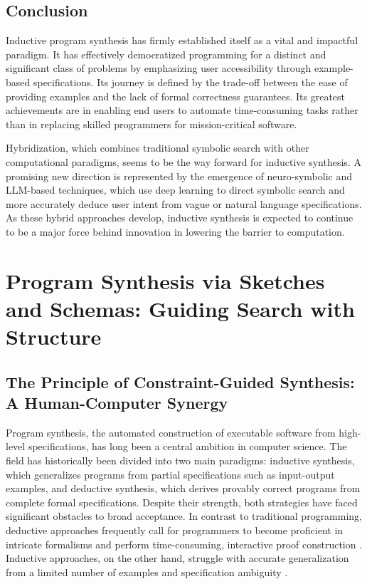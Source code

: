 \documentclass[12pt, a4paper]{report}
\begin{document}
\section{Conclusion}

Inductive program synthesis has firmly established itself as a vital and impactful paradigm. It has effectively democratized programming for a distinct and significant class of problems by emphasizing user accessibility through example-based specifications. Its journey is defined by the trade-off between the ease of providing examples and the lack of formal correctness guarantees. Its greatest achievements are in enabling end users to automate time-consuming tasks rather than in replacing skilled programmers for mission-critical software.

Hybridization, which combines traditional symbolic search with other computational paradigms, seems to be the way forward for inductive synthesis. A promising new direction is represented by the emergence of neuro-symbolic and LLM-based techniques, which use deep learning to direct symbolic search and more accurately deduce user intent from vague or natural language specifications. As these hybrid approaches develop, inductive synthesis is expected to continue to be a major force behind innovation in lowering the barrier to computation.

\chapter{Program Synthesis via Sketches and Schemas: Guiding Search with Structure}
\label{chap:sketch}

\section{The Principle of Constraint-Guided Synthesis: A Human-Computer Synergy}

Program synthesis, the automated construction of executable software from high-level specifications, has long been a central ambition in computer science. The field has historically been divided into two main paradigms: inductive synthesis, which generalizes programs from partial specifications such as input-output examples, and deductive synthesis, which derives provably correct programs from complete formal specifications. Despite their strength, both strategies have faced significant obstacles to broad acceptance. In contrast to traditional programming, deductive approaches frequently call for programmers to become proficient in intricate formalisms and perform time-consuming, interactive proof construction \citep{solar2008combinatorial}. Inductive approaches, on the other hand, struggle with accurate generalization from a limited number of examples and specification ambiguity \citep{singh2018interpretable}.
\end{document}
